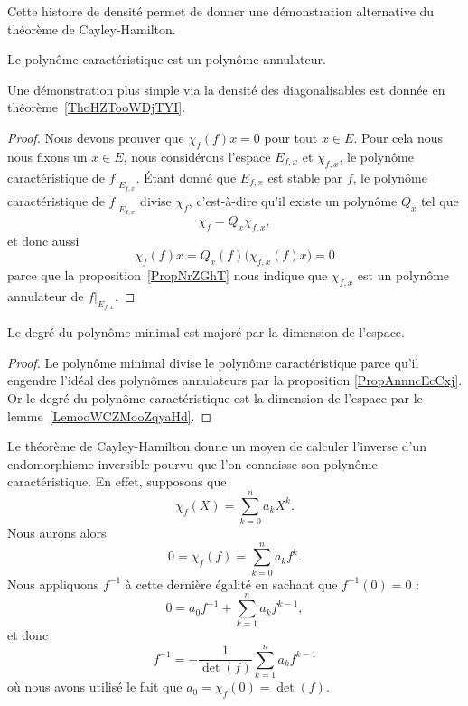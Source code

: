 Cette histoire de densité permet de donner une démonstration alternative du théorème de Cayley-Hamilton.
\begin{theorem}   \label{ThoCalYWLbJQ}
	Le polynôme caractéristique est un polynôme annulateur.
\end{theorem}

Une démonstration plus simple via la densité des diagonalisables est donnée en théorème~\ref{ThoHZTooWDjTYI}.
\begin{proof}
	Nous devons prouver que \( \chi_f(f)x=0\) pour tout \( x\in E\). Pour cela nous nous fixons un \( x\in E\), nous considérons l'espace \( E_{f,x}\) et \( \chi_{f,x}\), le polynôme caractéristique de \( f|_{E_{f,x}}\). Étant donné que \( E_{f,x}\) est stable par \( f\), le polynôme caractéristique de \( f|_{E_{f,x}}\) divise \( \chi_f\), c'est-à-dire qu'il existe un polynôme \( Q_x\) tel que
	\begin{equation}
		\chi_f=Q_x\chi_{f,x},
	\end{equation}
	et donc aussi
	\begin{equation}
		\chi_f(f)x=Q_x(f)\big( \chi_{f,x}(f)x \big)=0
	\end{equation}
	parce que la proposition~\ref{PropNrZGhT} nous indique que \( \chi_{f,x}\) est un polynôme annulateur de \( f|_{E_{f,x}}\).
\end{proof}

\begin{corollary}
	Le degré du polynôme minimal est majoré par la dimension de l'espace.
\end{corollary}

\begin{proof}
	Le polynôme minimal divise le polynôme caractéristique parce qu'il engendre l'idéal des polynômes annulateurs par la proposition \ref{PropAnnncEcCxj}. Or le degré du polynôme caractéristique est la dimension de l'espace par le lemme~\ref{LemooWCZMooZqyaHd}.
\end{proof}

\begin{example}
	Le théorème de Cayley-Hamilton donne un moyen de calculer l'inverse d'un endomorphisme inversible pourvu que l'on connaisse son polynôme caractéristique. En effet, supposons que
	\begin{equation}
		\chi_f(X)=\sum_{k=0}^na_kX^k.
	\end{equation}
	Nous aurons alors
	\begin{equation}
		0=\chi_f(f)=\sum_{k=0}^na_kf^k.
	\end{equation}
	Nous appliquons \( f^{-1}\) à cette dernière égalité en sachant que \( f^{-1}(0)=0\) :
	\begin{equation}
		0=a_0f^{-1}+\sum_{k=1}^na_kf^{k-1},
	\end{equation}
	et donc
	\begin{equation}
		f^{-1}=-\frac{1}{ \det(f) }\sum_{k=1}^na_kf^{k-1}
	\end{equation}
	où nous avons utilisé le fait que \( a_0=\chi_f(0)=\det(f)\).
\end{example}

